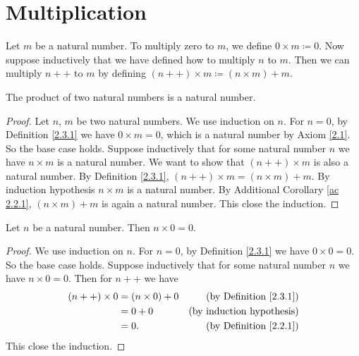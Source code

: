 \section{Multiplication}\label{sec 2.3}

\begin{definition}\label{2.3.1}
    Let \(m\) be a natural number.
    To multiply zero to \(m\), we define \(0 \times m \coloneqq 0\).
    Now suppose inductively that we have defined how to multiply \(n\) to \(m\).
    Then we can multiply \(n++\) to \(m\) by defining \((n++) \times m \coloneqq (n \times m) + m\).
\end{definition}

\begin{additional corollary}\label{ac 2.3.1}
The product of two natural numbers is a natural number.
\end{additional corollary}

\begin{proof}
    Let \(n\), \(m\) be two natural numbers.
    We use induction on \(n\).
    For \(n = 0\), by Definition \ref{2.3.1} we have \(0 \times m = 0\), which is a natural number by Axiom \ref{2.1}.
    So the base case holds.
    Suppose inductively that for some natural number \(n\) we have \(n \times m\) is a natural number.
    We want to show that \((n++) \times m\) is also a natural number.
    By Definition \ref{2.3.1}, \((n++) \times m = (n \times m) + m\).
    By induction hypothesis \(n \times m\) is a natural number.
    By Additional Corollary \ref{ac 2.2.1}, \((n \times m) + m\) is again a natural number.
    This close the induction.
\end{proof}

\begin{additional corollary}\label{ac 2.3.2}
Let \(n\) be a natural number.
Then \(n \times 0 = 0\).
\end{additional corollary}

\begin{proof}
    We use induction on \(n\).
    For \(n = 0\), by Definition \ref{2.3.1} we have \(0 \times 0 = 0\).
    So the base case holds.
    Suppose inductively that for some natural number \(n\) we have \(n \times 0 = 0\).
    Then for \(n++\) we have
    \begin{align*}
        (n++) \times 0 & = (n \times 0) + 0 & \text{(by Definition \ref{2.3.1})} \\
                       & = 0 + 0            & \text{(by induction hypothesis)}   \\
                       & = 0.               & \text{(by Definition \ref{2.2.1})}
    \end{align*}
    This close the induction.
\end{proof}

